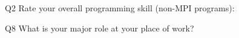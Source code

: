 \begin{description}%
\item{Q2} Rate your overall programming skill (non-MPI programs):%
\item{Q8} What is your major role at your place of work?%
\end{description}%
